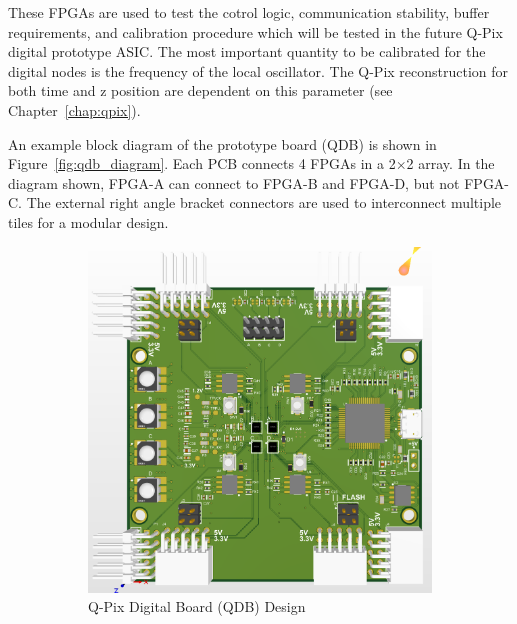 These FPGAs are used to test the cotrol logic, communication stability, buffer requirements, and calibration procedure which will be tested in the future Q-Pix digital prototype ASIC.
The most important quantity to be calibrated for the digital nodes is the frequency of the local oscillator.
The Q-Pix reconstruction for both time and z position are dependent on this parameter (see Chapter~\ref{chap:qpix}).

An example block diagram of the prototype board (QDB) is shown in Figure~\ref{fig:qdb_diagram}.
Each PCB connects 4 FPGAs in a 2$\times$2 array.
In the diagram shown, FPGA-A can connect to FPGA-B and FPGA-D, but not FPGA-C.
The external right angle bracket connectors are used to interconnect multiple tiles for a modular design.

\begin{figure}
\centering
\begin{subfigure}{.5\textwidth}
  \centering
  \includegraphics[width=\textwidth]{images/qdb_layout_altium.png}
  \caption{Q-Pix Digital Board (QDB) Design}
\end{subfigure}%
\begin{subfigure}{.5\textwidth}
  \centering

\end{subfigure}
\end{figure}
